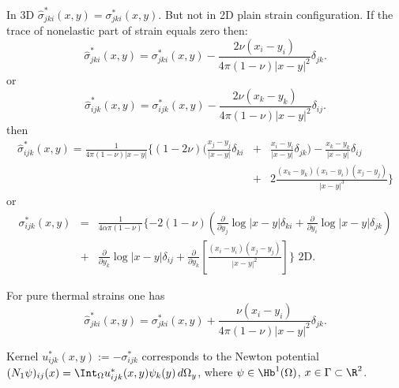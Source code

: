 \begin{remark}
In 3D $\hat{\sigma}^{*}_{jki}(x,y)=\sigma^{*}_{jki}(x,y)$. But not in 2D plain strain configuration. If the trace of nonelastic part of strain equals zero then: 
\begin{equation}
\hat{\sigma}^{*}_{jki}(x,y)=\sigma^{*}_{jki}(x,y)-\frac{2\nu (x_i-y_i)}{4\pi (1-\nu ) |x-y|^2}\delta_{jk}.
\end{equation}
or
\begin{equation}
\hat{\sigma}^{*}_{ijk}(x,y)=\sigma^{*}_{ijk}(x,y)-\frac{2\nu (x_k-y_k)}{4\pi (1-\nu ) |x-y|^2}\delta_{ij}.
\end{equation}
then
\begin{eqnarray}
\hat{\sigma}^{*}_{ijk}(x,y)=\frac{1}{4 \pi (1-\nu) |x-y|} \{ (1-2\nu)(\frac{x_j-y_j}{|x-y|}\delta_{ki}&+&\frac{x_i-y_i}{|x-y|}\delta_{jk})-\frac{x_k-y_k}{|x-y|}\delta_{ij} \nonumber \\
 &+&2\frac{(x_k-y_k)(x_i-y_i)(x_j-y_j)}{|x-y|^3}\} \nonumber
\end{eqnarray}
or
\begin{eqnarray}
\sigma^{*}_{ijk}(x,y)&=&\frac{1}{4\alpha \pi (1-\nu) } \{- 2(1-\nu)(\frac{\partial}{\partial y_j}\log|x-y|\delta_{ki}+\frac{\partial}{\partial y_i}\log|x-y|\delta_{jk}) \nonumber \\
&+&\frac{\partial}{\partial y_k}\log|x-y|\delta_{ij}+
\frac{\partial}{\partial y_k}\left[\frac{(x_i-y_i)(x_j-y_j)}{|x-y|^2}\right] \} \mbox{ 2D}.\nonumber 
\end{eqnarray}


For pure thermal strains one has
\begin{equation}
\hat{\sigma}^{*}_{jki}(x,y)=\sigma^{*}_{jki}(x,y)+\frac{\nu (x_i-y_i)}{4\pi (1-\nu ) |x-y|^2}\delta_{jk}.
\end{equation}
\end{remark}

\begin{definition} Kernel $u^{*}_{ijk}(x,y):=-\sigma^{*}_{ijk}$ corresponds to the Newton potential \linebreak $(N_{1}\psi)_{ij}(x)=\Int_{\Omega}u^{*}_{ijk}(x,y)\psi_{k}(y)\,d\Omega_{y}$, where $\psi\in \Hb^{1}(\Omega)$, $x\in\Gamma\subset \R^{2}$. 
\end{definition}

